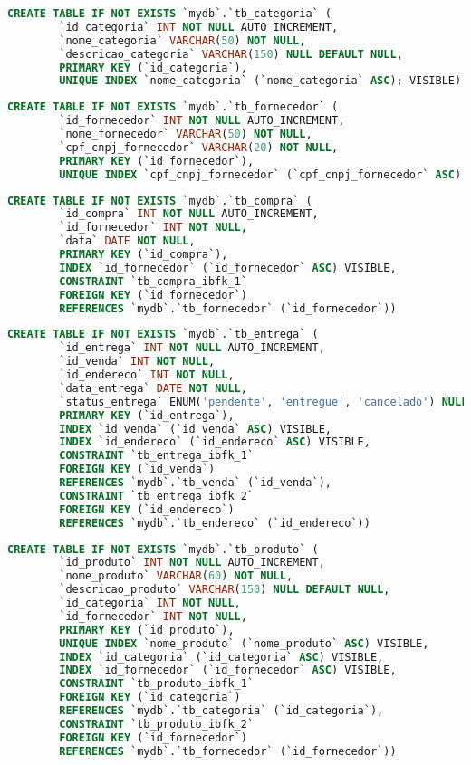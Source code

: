 \documentclass[
12pt,
a4paper,
semrecuonosumario,
sumario = abnt-6027-2012]{report}
\begin{document}
    \begin{lstlisting}[language=SQL,caption={DDL -- Tabela \texttt{tb\_categoria}}]
	    CREATE TABLE IF NOT EXISTS `mydb`.`tb_categoria` (
	    `id_categoria` INT NOT NULL AUTO_INCREMENT,
	    `nome_categoria` VARCHAR(50) NOT NULL,
	    `descricao_categoria` VARCHAR(150) NULL DEFAULT NULL,
	    PRIMARY KEY (`id_categoria`),
	    UNIQUE INDEX `nome_categoria` (`nome_categoria` ASC); VISIBLE)
    \end{lstlisting}
    \begin{lstlisting}[language=SQL,caption={DDL -- Tabela \texttt{tb\_fornecedor}}]
    	CREATE TABLE IF NOT EXISTS `mydb`.`tb_fornecedor` (
    	`id_fornecedor` INT NOT NULL AUTO_INCREMENT,
    	`nome_fornecedor` VARCHAR(50) NOT NULL,
    	`cpf_cnpj_fornecedor` VARCHAR(20) NOT NULL,
    	PRIMARY KEY (`id_fornecedor`),
    	UNIQUE INDEX `cpf_cnpj_fornecedor` (`cpf_cnpj_fornecedor` ASC) VISIBLE)
    \end{lstlisting}
    \begin{lstlisting}[language=SQL,caption={DDL -- Tabela \texttt{tb\_compra}}]
    	CREATE TABLE IF NOT EXISTS `mydb`.`tb_compra` (
    	`id_compra` INT NOT NULL AUTO_INCREMENT,
    	`id_fornecedor` INT NOT NULL,
    	`data` DATE NOT NULL,
    	PRIMARY KEY (`id_compra`),
    	INDEX `id_fornecedor` (`id_fornecedor` ASC) VISIBLE,
    	CONSTRAINT `tb_compra_ibfk_1`
    	FOREIGN KEY (`id_fornecedor`)
    	REFERENCES `mydb`.`tb_fornecedor` (`id_fornecedor`))
    \end{lstlisting}
    \begin{lstlisting}[language=SQL,caption={DDL -- Tabela \texttt{tb\_entrega}}]
    	CREATE TABLE IF NOT EXISTS `mydb`.`tb_entrega` (
    	`id_entrega` INT NOT NULL AUTO_INCREMENT,
    	`id_venda` INT NOT NULL,
    	`id_endereco` INT NOT NULL,
    	`data_entrega` DATE NOT NULL,
    	`status_entrega` ENUM('pendente', 'entregue', 'cancelado') NULL DEFAULT 'pendente',
    	PRIMARY KEY (`id_entrega`),
    	INDEX `id_venda` (`id_venda` ASC) VISIBLE,
    	INDEX `id_endereco` (`id_endereco` ASC) VISIBLE,
    	CONSTRAINT `tb_entrega_ibfk_1`
    	FOREIGN KEY (`id_venda`)
    	REFERENCES `mydb`.`tb_venda` (`id_venda`),
    	CONSTRAINT `tb_entrega_ibfk_2`
    	FOREIGN KEY (`id_endereco`)
    	REFERENCES `mydb`.`tb_endereco` (`id_endereco`))
    \end{lstlisting}
    \begin{lstlisting}[language=SQL,caption={DDL -- Tabela \texttt{tb\_produto}}]
    	CREATE TABLE IF NOT EXISTS `mydb`.`tb_produto` (
    	`id_produto` INT NOT NULL AUTO_INCREMENT,
    	`nome_produto` VARCHAR(60) NOT NULL,
    	`descricao_produto` VARCHAR(150) NULL DEFAULT NULL,
    	`id_categoria` INT NOT NULL,
    	`id_fornecedor` INT NOT NULL,
    	PRIMARY KEY (`id_produto`),
    	UNIQUE INDEX `nome_produto` (`nome_produto` ASC) VISIBLE,
    	INDEX `id_categoria` (`id_categoria` ASC) VISIBLE,
    	INDEX `id_fornecedor` (`id_fornecedor` ASC) VISIBLE,
    	CONSTRAINT `tb_produto_ibfk_1`
    	FOREIGN KEY (`id_categoria`)
    	REFERENCES `mydb`.`tb_categoria` (`id_categoria`),
    	CONSTRAINT `tb_produto_ibfk_2`
    	FOREIGN KEY (`id_fornecedor`)
    	REFERENCES `mydb`.`tb_fornecedor` (`id_fornecedor`))
    \end{lstlisting}
\end{document}

